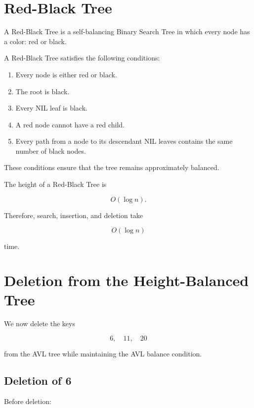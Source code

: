 \documentclass[12pt,a4paper]{article}
\begin{document}
\section{Red-Black Tree}

A Red-Black Tree is a self-balancing Binary Search Tree in which every node has a color: red or black.

A Red-Black Tree satisfies the following conditions:

\begin{enumerate}
    \item Every node is either red or black.
    \item The root is black.
    \item Every NIL leaf is black.
    \item A red node cannot have a red child.
    \item Every path from a node to its descendant NIL leaves contains the same number of black nodes.
\end{enumerate}

These conditions ensure that the tree remains approximately balanced.

The height of a Red-Black Tree is

\[
O(\log n).
\]

Therefore, search, insertion, and deletion take

\[
O(\log n)
\]

time.

\section{Deletion from the Height-Balanced Tree}

We now delete the keys

\[
6,\quad 11,\quad 20
\]

from the AVL tree while maintaining the AVL balance condition.

\subsection{Deletion of 6}

Before deletion:

\begin{center}
\end{center}
\end{document}
